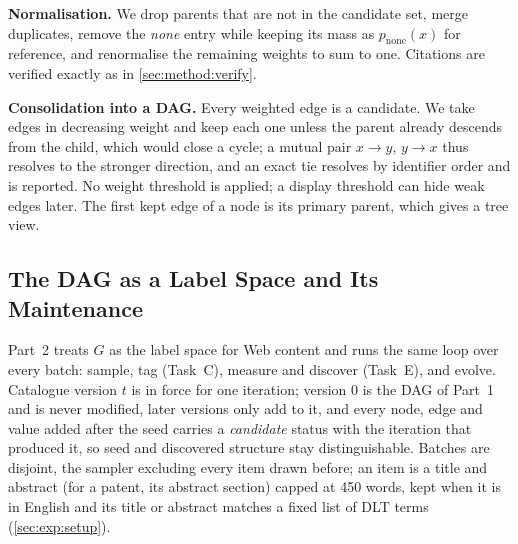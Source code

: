 \textbf{Normalisation.} We drop parents that are not in the candidate set, merge
duplicates, remove the \emph{none} entry while keeping its mass as $p_{\text{none}}(x)$
for reference, and renormalise the remaining weights to sum to one. Citations
are verified exactly as in \cref{sec:method:verify}.

\textbf{Consolidation into a DAG.} Every weighted edge is a candidate. We take
edges in decreasing weight and keep each one unless the parent already descends
from the child, which would close a cycle; a mutual pair $x \to y$, $y \to x$
thus resolves to the stronger direction, and an exact tie resolves by identifier
order and is reported. No weight threshold is applied; a display threshold
can hide weak edges later. The first kept edge of a node is its primary parent,
which gives a tree view.

\subsection{The DAG as a Label Space and Its Maintenance}
\label{sec:method:maintain}

Part~2 treats $G$ as the label space for Web content and runs the same loop
over every batch: sample, tag (Task~C), measure and discover (Task~E), and
evolve. Catalogue version $t$ is in force for one iteration; version 0 is the
DAG of Part~1 and is never modified, later versions only add to it, and every
node, edge and value added after the seed carries a \emph{candidate} status
with the iteration that produced it, so seed and discovered structure stay
distinguishable. Batches are disjoint, the sampler excluding every item drawn
before; an item is a title and abstract (for a patent, its abstract section)
capped at 450 words, kept when it is in English and its title or abstract
matches a fixed list of DLT terms (\cref{sec:exp:setup}).

